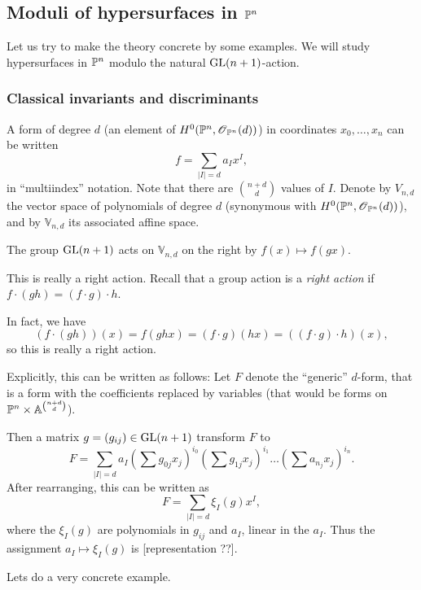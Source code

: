 \documentclass[11pt, english]{article}
\newcommand{\vnd}{\mathbb V_{n,d}}
\begin{document}
\subsection{Moduli of hypersurfaces in $\mathbb{P}^n$}

Let us try to make the theory concrete by some examples. We will study hypersurfaces in $\mathbb{P}^n$ modulo the natural $\operatorname{GL}(n+1)$-action.

\subsubsection{Classical invariants and discriminants}

A form of degree $d$ (an element of $H^0(\mathbb{P}^n,\operatorname{\mathscr{O}}_{\mathbb{P}^n}(d))$) in coordinates $x_0,\ldots,x_n$ can be written
\[
f = \sum_{\lvert I \rvert = d} a_I x^I,
\]
in ``multiindex'' notation. Note that there are $\binom{n+d}{d}$ values of $I$. Denote by $V_{n,d}$ the vector space of polynomials of degree $d$ (synonymous with $H^0(\mathbb{P}^n, \operatorname{\mathscr{O}}_{\mathbb{P}^n}(d))$), and by $\mathbb V_{n,d}$ its associated affine space.

The group $\operatorname{GL}(n+1)$ acts on $\vnd$ on the right by $f(x) \mapsto f(gx)$.
\begin{remark}
  This is really a right action. Recall that a group action is a \emph{right action} if $f \cdot (gh) = (f \cdot g) \cdot h$.

In fact, we have $$(f \cdot (gh))(x) = f(ghx) = (f \cdot g)(hx) = ((f \cdot g) \cdot h)(x),$$
so this is really a right action.
\end{remark}

Explicitly, this can be written as follows: Let $F$ denote the ``generic'' $d$-form, that is a form with the coefficients replaced by variables (that would be forms on $\mathbb{P}^n \times \mathbb{A}^{\binom{n+d}{d}}$).

Then a matrix $g=(g_{ij}) \in \operatorname{GL}(n+1)$ transform $F$ to
\[
F = \sum_{\lvert I \rvert=d} a_I(\sum g_{0j}x_j)^{i_0}(\sum g_{1j}x_j)^{i_1} \ldots (\sum a_{n_j} x_j)^{i_n}.
\]
After rearranging, this can be written as
\[
F = \sum_{\lvert I \rvert = d} \xi_I(g) x^I,
\]
where the $\xi_I(g)$ are polynomials in $g_{ij}$ and $a_I$, linear in the $a_I$. Thus the assignment $a_I \mapsto \xi_I(g)$ is [representation ??].

Lets do a very concrete example.
\end{document}
